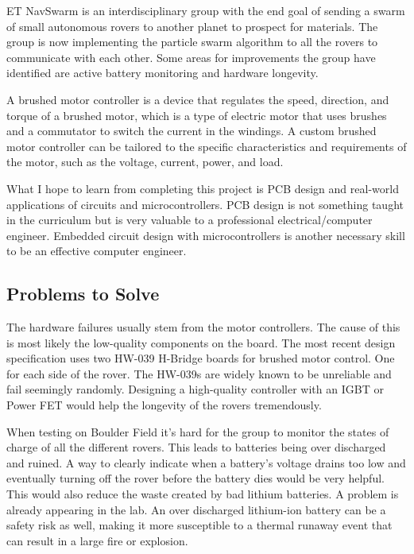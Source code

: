\documentclass[conference]{IEEEtran}
\begin{document}
ET NavSwarm is an interdisciplinary group with the end goal of sending a swarm of small autonomous rovers to another planet to prospect for materials. The group is now implementing the particle swarm algorithm to all the rovers to communicate with each other. Some areas for improvements the group have identified are active battery monitoring and hardware longevity.
\par A brushed motor controller is a device that regulates the speed, direction, and torque of a brushed motor, which is a type of electric motor that uses brushes and a commutator to switch the current in the windings. A custom brushed motor controller can be tailored to the specific characteristics and requirements of the motor, such as the voltage, current, power, and load.
\par What I hope to learn from completing this project is PCB design and real-world applications of circuits and microcontrollers. PCB design is not something taught in the curriculum but is very valuable to a professional electrical/computer engineer. Embedded circuit design with microcontrollers is another necessary skill to be an effective computer engineer.

\subsection{Problems to Solve}

The hardware failures usually stem from the motor controllers. The cause of this is most likely the low-quality components on the board. The most recent design specification uses two HW-039 H-Bridge boards for brushed motor control. One for each side of the rover. The HW-039s are widely known to be unreliable and fail seemingly randomly. Designing a high-quality controller with an IGBT or Power FET would help the longevity of the rovers tremendously.
\par When testing on Boulder Field it's hard for the group to monitor the states of charge of all the different rovers. This leads to batteries being over discharged and ruined. A way to clearly indicate when a battery's voltage drains too low and eventually turning off the rover before the battery dies would be very helpful. This would also reduce the waste created by bad lithium batteries. A problem is already appearing in the lab. An over discharged lithium-ion battery can be a safety risk as well, making it more susceptible to a thermal runaway event that can result in a large fire or explosion.
\end{document}
